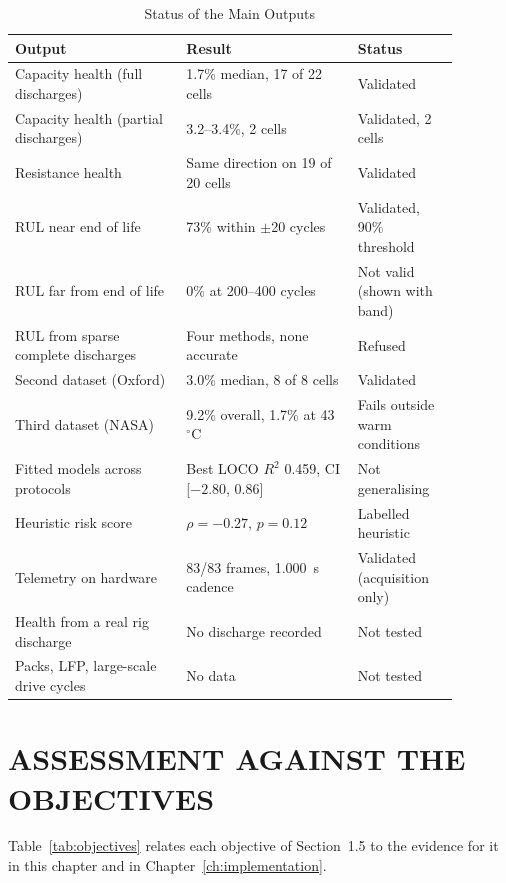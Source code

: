 \begin{table}[htbp]
	\caption{Status of the Main Outputs}
	\centering
	\footnotesize
	\renewcommand{\arraystretch}{1.15}
	\setlength{\tabcolsep}{3pt}
	\begin{tabular}{|L{0.34\linewidth}|L{0.34\linewidth}|L{0.2\linewidth}|}
		\hline
		\textbf{Output} & \textbf{Result} & \textbf{Status} \\
		\hline
		Capacity health (full discharges) & 1.7\% median, 17 of 22 cells & Validated \\
		\hline
		Capacity health (partial discharges) & 3.2--3.4\%, 2 cells & Validated, 2 cells \\
		\hline
		Resistance health & Same direction on 19 of 20 cells & Validated \\
		\hline
		RUL near end of life & 73\% within $\pm$20 cycles & Validated, 90\% threshold \\
		\hline
		RUL far from end of life & 0\% at 200--400 cycles & Not valid (shown with band) \\
		\hline
		RUL from sparse complete discharges & Four methods, none accurate & Refused \\
		\hline
		Second dataset (Oxford) & 3.0\% median, 8 of 8 cells & Validated \\
		\hline
		Third dataset (NASA) & 9.2\% overall, 1.7\% at 43~$^\circ$C & Fails outside warm conditions \\
		\hline
		Fitted models across protocols & Best LOCO $R^2$ 0.459, CI [$-2.80$, 0.86] & Not generalising \\
		\hline
		Heuristic risk score & $\rho=-0.27$, $p=0.12$ & Labelled heuristic \\
		\hline
		Telemetry on hardware & 83/83 frames, 1.000~s cadence & Validated (acquisition only) \\
		\hline
		Health from a real rig discharge & No discharge recorded & Not tested \\
		\hline
		Packs, LFP, large-scale drive cycles & No data & Not tested \\
		\hline
	\end{tabular}
	\label{tab:summary}
\end{table}

\section{ASSESSMENT AGAINST THE OBJECTIVES}

Table~\ref{tab:objectives} relates each objective of Section~1.5 to the evidence for it in this chapter and in Chapter~\ref{ch:implementation}.

